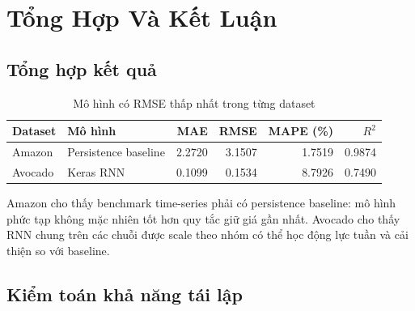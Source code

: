 \documentclass[12pt,a4paper]{report}
\begin{document}
\chapter{Tổng Hợp Và Kết Luận}

\section{Tổng hợp kết quả}
\begin{table}[H]
\centering
\caption{Mô hình có RMSE thấp nhất trong từng dataset}
\label{tab:master_summary}
\begin{tabular}{llrrrr}
\toprule
\textbf{Dataset} & \textbf{Mô hình} & \textbf{MAE} & \textbf{RMSE} & \textbf{MAPE (\%)} & \textbf{$R^2$} \\
\midrule
Amazon & Persistence baseline & 2.2720 & 3.1507 & 1.7519 & 0.9874 \\
Avocado & Keras RNN & 0.1099 & 0.1534 & 8.7926 & 0.7490 \\
\bottomrule
\end{tabular}
\end{table}

Amazon cho thấy benchmark time-series phải có persistence baseline: mô hình phức tạp không mặc nhiên
tốt hơn quy tắc giữ giá gần nhất. Avocado cho thấy RNN chung trên các chuỗi được scale theo nhóm có thể
học động lực tuần và cải thiện so với baseline.

\section{Kiểm toán khả năng tái lập}
\begin{table}[H]
\centering
\caption{Checklist tái lập Assignment 06}
\label{tab:reproducibility}
\end{table}
\end{document}
